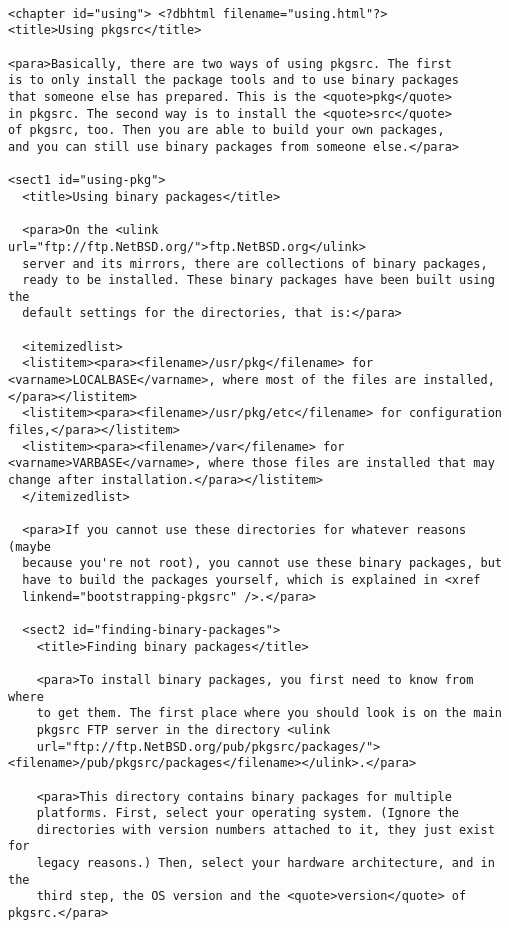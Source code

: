 \begin{verbatim}

<chapter id="using"> <?dbhtml filename="using.html"?>
<title>Using pkgsrc</title>

<para>Basically, there are two ways of using pkgsrc. The first
is to only install the package tools and to use binary packages
that someone else has prepared. This is the <quote>pkg</quote>
in pkgsrc. The second way is to install the <quote>src</quote>
of pkgsrc, too. Then you are able to build your own packages,
and you can still use binary packages from someone else.</para>

<sect1 id="using-pkg">
  <title>Using binary packages</title>

  <para>On the <ulink url="ftp://ftp.NetBSD.org/">ftp.NetBSD.org</ulink>
  server and its mirrors, there are collections of binary packages,
  ready to be installed. These binary packages have been built using the
  default settings for the directories, that is:</para>

  <itemizedlist>
  <listitem><para><filename>/usr/pkg</filename> for <varname>LOCALBASE</varname>, where most of the files are installed,</para></listitem>
  <listitem><para><filename>/usr/pkg/etc</filename> for configuration files,</para></listitem>
  <listitem><para><filename>/var</filename> for <varname>VARBASE</varname>, where those files are installed that may change after installation.</para></listitem>
  </itemizedlist>

  <para>If you cannot use these directories for whatever reasons (maybe
  because you're not root), you cannot use these binary packages, but
  have to build the packages yourself, which is explained in <xref
  linkend="bootstrapping-pkgsrc" />.</para>

  <sect2 id="finding-binary-packages">
    <title>Finding binary packages</title>

    <para>To install binary packages, you first need to know from where
    to get them. The first place where you should look is on the main
    pkgsrc FTP server in the directory <ulink
    url="ftp://ftp.NetBSD.org/pub/pkgsrc/packages/"><filename>/pub/pkgsrc/packages</filename></ulink>.</para>

    <para>This directory contains binary packages for multiple
    platforms. First, select your operating system. (Ignore the
    directories with version numbers attached to it, they just exist for
    legacy reasons.) Then, select your hardware architecture, and in the
    third step, the OS version and the <quote>version</quote> of pkgsrc.</para>


\end{verbatim}
